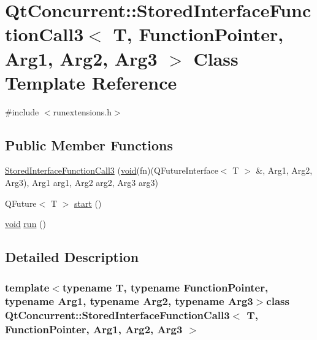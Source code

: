 \hypertarget{class_qt_concurrent_1_1_stored_interface_function_call3}{\section{\-Qt\-Concurrent\-:\-:\-Stored\-Interface\-Function\-Call3$<$ \-T, \-Function\-Pointer, \-Arg1, \-Arg2, \-Arg3 $>$ \-Class \-Template \-Reference}
\label{class_qt_concurrent_1_1_stored_interface_function_call3}
}


{\ttfamily \#include $<$runextensions.\-h$>$}

\subsection*{\-Public \-Member \-Functions}
\begin{DoxyCompactItemize}
\item 
\hyperlink{class_qt_concurrent_1_1_stored_interface_function_call3_aab650138bdc7b62f6378abc2f8e8429b}{\-Stored\-Interface\-Function\-Call3} (\hyperlink{group___u_a_v_objects_plugin_ga444cf2ff3f0ecbe028adce838d373f5c}{void}(fn)(\-Q\-Future\-Interface$<$ \-T $>$ \&, \-Arg1, \-Arg2, \-Arg3), \-Arg1 arg1, \-Arg2 arg2, \-Arg3 arg3)
\item 
\-Q\-Future$<$ \-T $>$ \hyperlink{class_qt_concurrent_1_1_stored_interface_function_call3_ae27e1e2dd890acfac0bc5fd39264d031}{start} ()
\item 
\hyperlink{group___u_a_v_objects_plugin_ga444cf2ff3f0ecbe028adce838d373f5c}{void} \hyperlink{class_qt_concurrent_1_1_stored_interface_function_call3_ac037e957e140a31927ecd532b8ef84fb}{run} ()
\end{DoxyCompactItemize}


\subsection{\-Detailed \-Description}
\subsubsection*{template$<$typename T, typename Function\-Pointer, typename Arg1, typename Arg2, typename Arg3$>$class Qt\-Concurrent\-::\-Stored\-Interface\-Function\-Call3$<$ T, Function\-Pointer, Arg1, Arg2, Arg3 $>$}



